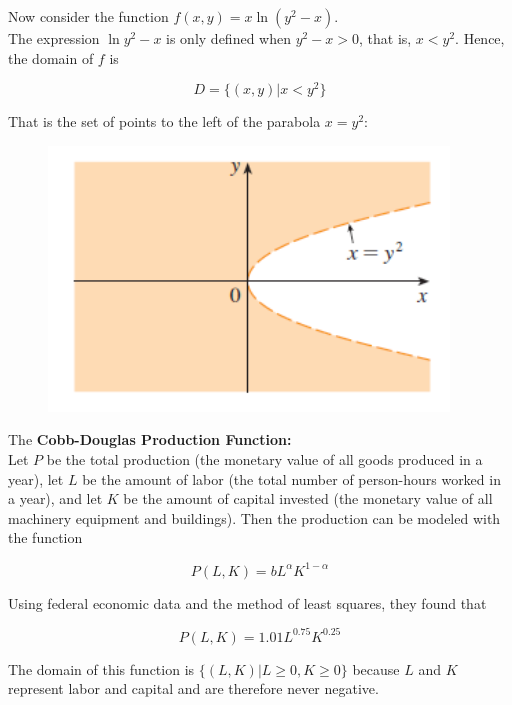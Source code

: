         \textit{} Now consider the function $f(x,y) = x\ln{(y^2 - x)}$. \\

        The expression $\ln{y^2 - x}$ is only defined when $y^2 - x > 0$, that is, $x < y^2$. Hence, the domain of $f$ is

        \[
            D = \{(x,y)|x < y^2\}
        \]

        That is the set of points to the left of the parabola $x=y^2$:

        \begin{figure}[hbt!]
            \centering
            \includegraphics[scale = 0.75]{Resources/14.1_Domain_Sketch2}
        \end{figure}

        The \textbf{Cobb-Douglas Production Function:} \\

        Let $P$ be the total production (the monetary value of all goods produced in a year), let $L$ be the amount of labor (the total number of person-hours worked in a year), and let $K$ be the amount of capital
        invested (the monetary value of all machinery equipment and buildings). Then the production can be modeled with the function

        \[
            P(L,K) = b L^{\alpha} K^{1-\alpha}
        \]

        Using federal economic data and the method of least squares, they found that

        \[
            P(L,K) = 1.01 L^{0.75} K^{0.25}
        \]

        The domain of this function is $\{(L,K)|L\geq 0, K\geq 0\}$ because $L$ and $K$ represent labor and capital and are therefore never negative. \\

